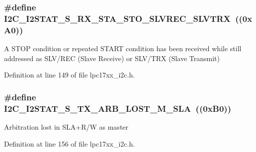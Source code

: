 \subsubsection[{\texorpdfstring{I2\+C\+\_\+\+I2\+S\+T\+A\+T\+\_\+\+S\+\_\+\+R\+X\+\_\+\+S\+T\+A\+\_\+\+S\+T\+O\+\_\+\+S\+L\+V\+R\+E\+C\+\_\+\+S\+L\+V\+T\+RX}{I2C_I2STAT_S_RX_STA_STO_SLVREC_SLVTRX}}]{\setlength{\rightskip}{0pt plus 5cm}\#define I2\+C\+\_\+\+I2\+S\+T\+A\+T\+\_\+\+S\+\_\+\+R\+X\+\_\+\+S\+T\+A\+\_\+\+S\+T\+O\+\_\+\+S\+L\+V\+R\+E\+C\+\_\+\+S\+L\+V\+T\+RX~((0x\+A0))}\hypertarget{group___i2_c___private___macros_ga7afe9f0e54aeb9ce8428c0adeb3c3274}{}\label{group___i2_c___private___macros_ga7afe9f0e54aeb9ce8428c0adeb3c3274}
A S\+T\+OP condition or repeated S\+T\+A\+RT condition has been received while still addressed as S\+L\+V/\+R\+EC (Slave Receive) or S\+L\+V/\+T\+RX (Slave Transmit) 

Definition at line 149 of file lpc17xx\+\_\+i2c.\+h.

\subsubsection[{\texorpdfstring{I2\+C\+\_\+\+I2\+S\+T\+A\+T\+\_\+\+S\+\_\+\+T\+X\+\_\+\+A\+R\+B\+\_\+\+L\+O\+S\+T\+\_\+\+M\+\_\+\+S\+LA}{I2C_I2STAT_S_TX_ARB_LOST_M_SLA}}]{\setlength{\rightskip}{0pt plus 5cm}\#define I2\+C\+\_\+\+I2\+S\+T\+A\+T\+\_\+\+S\+\_\+\+T\+X\+\_\+\+A\+R\+B\+\_\+\+L\+O\+S\+T\+\_\+\+M\+\_\+\+S\+LA~((0x\+B0))}\hypertarget{group___i2_c___private___macros_gac71ac23a80e1bdb700a2c37170031107}{}\label{group___i2_c___private___macros_gac71ac23a80e1bdb700a2c37170031107}
Arbitration lost in S\+L\+A+\+R/W as master 

Definition at line 156 of file lpc17xx\+\_\+i2c.\+h.

